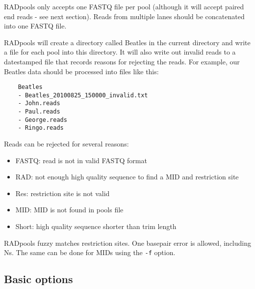 \documentclass[a4paper]{article}
\begin{document}
RADpools only accepts one FASTQ file per pool (although it will accept paired end reads - see next section). Reads from multiple lanes should be concatenated into one FASTQ file.

RADpools will create a directory called Beatles in the current directory and write a file for each pool into this directory. It will also write out invalid reads to a datestamped file that records reasons for rejecting the reads. For example, our Beatles data should be processed into files like this:

\begin{verbatim}
    Beatles
    - Beatles_20100825_150000_invalid.txt
    - John.reads
    - Paul.reads
    - George.reads
    - Ringo.reads
\end{verbatim}

Reads can be rejected for several reasons:
\begin{itemize}
    \item FASTQ: read is not in valid FASTQ format
    \item RAD: not enough high quality sequence to find a MID and restriction site
    \item Res: restriction site is not valid
    \item MID: MID is not found in pools file
    \item Short: high quality sequence shorter than trim length
\end{itemize}

RADpools fuzzy matches restriction sites. One basepair error is allowed, including Ns. The same can be done for MIDs using the \verb|-f| option.

\subsection{Basic options}
\end{document}
